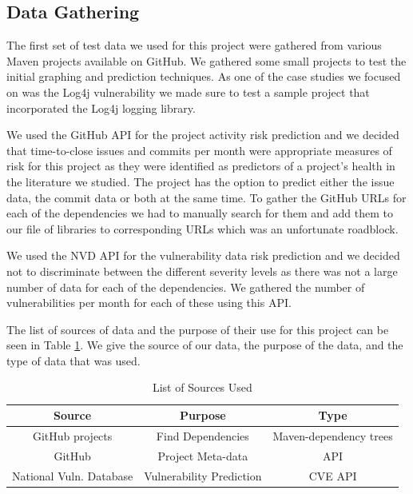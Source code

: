 \documentclass[10pt, compsoc, conference]{IEEEtran}
\begin{document}
\subsection{Data Gathering}
The first set of test data we used for this project were gathered from various Maven projects available on GitHub. We gathered some small projects to test the initial graphing and prediction techniques. As one of the case studies we focused on was the Log4j vulnerability we made sure to test a sample project that incorporated the Log4j logging library. 

We used the GitHub API for the project activity risk prediction and we decided that time-to-close issues and commits per month were appropriate measures of risk for this project as they were identified as predictors of a project's health in the literature we studied. The project has the option to predict either the issue data, the commit data or both at the same time. To gather the GitHub URLs for each of the dependencies we had to manually search for them and add them to our file of libraries to corresponding URLs which was an unfortunate roadblock. 

We used the NVD API for the vulnerability data risk prediction and we decided not to discriminate between the different severity levels as there was not a large number of data for each of the dependencies. We gathered the number of vulnerabilities per month for each of these using this API. 

The list of sources of data and the purpose of their use for this project can be seen in Table \ref{sourcelist}. We give the source of our data, the purpose of the data, and the type of data that was used. 

\begin{table}
 \caption{List of Sources Used}
\label{sourcelist}
\begin{center}
\begin{tabular}{|c|c|c|}
\hline
    \textbf{Source} & \textbf{Purpose} & \textbf{Type} \\ \hline
    GitHub projects & Find Dependencies & Maven-dependency trees \\ \hline
    GitHub & Project Meta-data & API  \\ \hline
    National Vuln. Database & Vulnerability Prediction & CVE API \\ \hline
\end{tabular}
\end{center}
\end{table}
\end{document}
